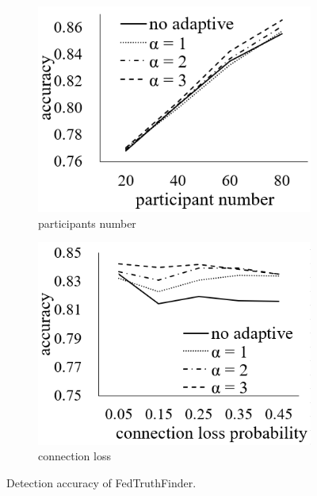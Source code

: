 \begin{figure}
	\centering
		\begin{subfigure}[t]{.3\linewidth}
			\includegraphics[width=1\linewidth]{./fig/truth_acc_traffic_participant_num.PNG}
			\caption{participants number}
			\label{fig:acc_vary_participant_num}
		\end{subfigure}
		\quad
		\begin{subfigure}[t]{.3\linewidth}
			\includegraphics[width=1\linewidth]{./fig/truth_acc_traffic_connection_loss.PNG}
			\caption{connection loss}
			\label{fig:acc_vary_connection_loss}
		\end{subfigure}
		\caption{Detection accuracy of FedTruthFinder.}
\end{figure}

